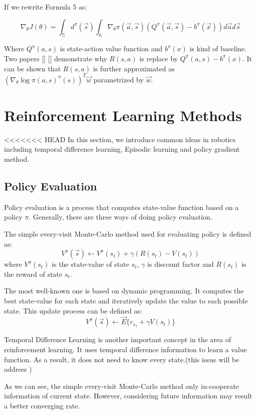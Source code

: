 \documentclass[officiallayout]{tktla}
\begin{document}
If we rewrite Formula 5 as:

\begin{equation}
\nabla_\theta J(\theta) = \int_\mathbb{S} d^\pi(\vec{s})\int_\mathbb{A}\nabla_\theta \pi(\vec{a}, \vec{s})(Q^\pi(\vec{a}, \vec{s}) -b^\pi(\vec{x}))d\vec{a}d\vec{s}
\end{equation}



Where $Q^\pi(a, s)$ is state-action value function and $b^\pi(x)$ is kind of baseline. Two
papers [] [] demonstrate why $R(s, a)$ is replace by $Q^\pi(a, s) - b^\pi(x)$. It can be
shown that $R(s, a)$ is further approximated as $(\nabla_\theta \log\pi(a,s)^\pi(s))^T \vec{w}$ parametrized by $\vec{w}$.
\section{Reinforcement Learning Methods}
<<<<<<< HEAD
In this section, we introduce common ideas in robotics including temporal difference learning, Episodic learning and policy gradient method.
\subsection{Policy Evaluation}
Policy evaluation is a process that computes state-value function based on a policy $\pi$. Generally, there are three ways of doing policy evaluation. 

The simple every-visit Monte-Carlo method used for evaluating policy is defined as:
\begin{equation}
V^\pi(\vec{s}) \leftarrow V^\pi(s_t) + \gamma (R(s_t) - V(s_t))
\end{equation}
where $V^\pi(s_t)$ is the state-value of state $s_t$, $\gamma$ is discount factor and $R(s_t)$ is the reward of state $s_t$. 

The most well-known one is based on dynamic programming. It computes the best state-value for each state and iteratively update the value to each possible state. This update process can be defined as:
\begin{equation}
V^\pi(\vec{s}) \leftarrow \vec{E}\{r_{s_1} + \gamma V(s_t)\}
\end{equation}

Temporal Difference Learning is another important concept in the area of reinforcement learning. It uses temporal difference information to learn a value function. As a result, it does not need to know every state.(this issue will be address )

As we can see, the simple every-visit Monte-Carlo method only in-cooperate information of current state. However, considering future information may result a better converging rate.
\end{document}
